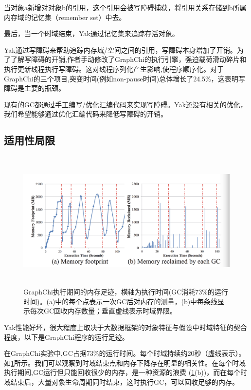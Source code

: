 当对象a新增对对象b的引用，这个引用会被写障碍捕获，将引用关系存储到b所属内存域的记忆集（remember set）中去。

最后，当一个时域结束，Yak通过记忆集来追踪存活对象。

Yak通过写障碍来帮助追踪内存域/空间之间的引用，写障碍本身增加了开销。为了了解写障碍的开销,作者手动修改了GraphChi的执行引擎，强迫载荷滑动碎片和执行更新线程执行写障碍。这对线程序列化产生影响,使程序顺序化。对于GraphChi的三个项目,突变时间(例如non-pause时间)总体增长了24.5\%，这表明写障碍是主要的瓶颈。

现有的GC都通过手工编写/优化汇编代码来实现写障碍。Yak还没有相关的优化，我们希望能够通过优化汇编代码来降低写障碍的开销。


\subsection{适用性局限}
\begin{figure}[h]
    \centering
    \includegraphics[width=12cm,height=7cm]{figure/footprint1.jpg}
    \caption{
        GraphChi执行期间的内存足迹，横轴为执行时间(GC消耗73\%的运行时间)。(a)中的每个点表示一次GC后对内存的测量，(b)中每条线显示每次GC回收内存数量；垂直虚线表示时域界限。
    }
    \label{footprint1}
\end{figure}

Yak性能好坏，很大程度上取决于大数据框架的对象特征与假设中时域特征的契合程度，以下是GraphChi程序的运行足迹。

在GraphChi实验中,GC占据73\%的运行时间。每个时域持续约20秒（虚线表示）。如\ref{footprint1}所示。我们可以观察到时域结束点和内存下降存在明显的相关性。在每个时域执行期间,GC运行但只能回收很少的内存，是一种资源的浪费 (\ref{footprint1}(b))，而在每个时域结束后，大量对象生命周期同时结束，这时执行GC，可以回收足够的内存。

